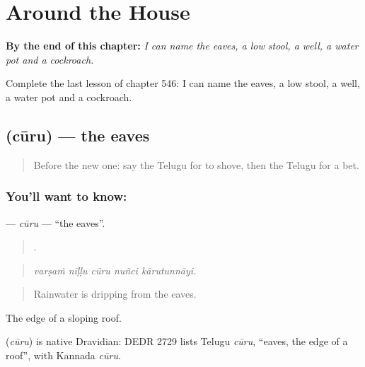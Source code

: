 
\chapter{Around the House}
\label{ch:te-around-the-house}

\begin{chapteropening}
\textbf{By the end of this chapter:} \emph{I can name the eaves, a low stool, a well, a water pot and a cockroach.}

Complete the last lesson of chapter 546: I can name the eaves, a low stool, a well, a water pot and a cockroach.
\end{chapteropening}

\section[\texorpdfstring{\te{చూరు} (cūru)}{చూరు (cūru)}]{ (cūru) — the eaves}

\label{lesson:TE-C546-curu}



\begin{quote}
Before the new one: say the Telugu for to shove, then the Telugu for a bet.
\end{quote}

\subsection*{You'll want to know: }
\textbf{} — \emph{cūru} — \textquotedblleft{}the eaves\textquotedblright{}.

\begin{quote}
    .
\end{quote}

\begin{quote}
\emph{varṣaṁ nīḷḷu cūru nuñci kārutunnāyi.}
\end{quote}

\begin{quote}
Rainwater is dripping from the eaves.
\end{quote}

The edge of a sloping roof.

\begin{cousinweb}
\textbf{} (\emph{cūru}) is native Dravidian: DEDR 2729 lists Telugu \emph{cūru}, \textquotedblleft{}eaves, the edge of a roof\textquotedblright{}, with Kannada \emph{cūru}.
\end{cousinweb}

